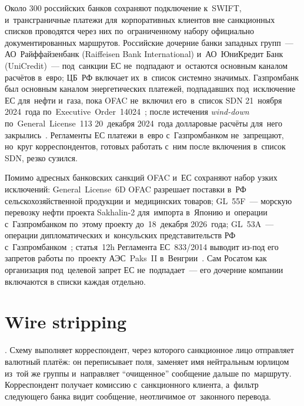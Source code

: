 Около 300 российских банков сохраняют подключение к~SWIFT,
и~трансграничные платежи для~корпоративных клиентов вне санкционных списков проводятся
через них по~ограниченному набору официально документированных маршрутов. Российские
дочерние банки западных групп~--- АО~Райффайзенбанк (Raiffeisen Bank International)
и~АО~ЮниКредит Банк (UniCredit)~--- под~санкции ЕС не~подпадают и~остаются
основным каналом расчётов в~евро; ЦБ~РФ включает их~в~список системно
значимых. Газпромбанк был основным каналом энергетических платежей,
подпадавших под~исключение ЕС для~нефти и~газа, пока OFAC не~включил его~в~список SDN
21~ноября 2024~года по~Executive~Order~14024~\cite{ofac-jy2725-gazprombank}; после истечения
\textit{wind-down} по~General~License~113 20~декабря 2024~года долларовые расчёты
для~него закрылись~\cite{ofac-gl-113}. Регламенты ЕС платежи в~евро с~Газпромбанком не~запрещают, но~круг
корреспондентов, готовых работать с~ним после включения в~список SDN, резко сузился.

Помимо
адресных банковских санкций OFAC и~ЕС сохраняют набор узких
исключений: General~License~6D OFAC разрешает поставки в~РФ
сельскохозяйственной продукции и~медицинских товаров; GL~55F~--- морскую
перевозку нефти проекта Sakhalin-2 для~импорта в~Японию и~операции
с~Газпромбанком по~этому проекту до~18~декабря 2026~года; GL~53A~---
операции дипломатических и~консульских представительств РФ
с~Газпромбанком~\cite{ofac-russia-sanctions}; статья~12h Регламента ЕС~833/2014
выводит из-под его запретов работы по~проекту АЭС~Paks~II
в~Венгрии~\cite{eu-reg-833-2014}. Сам Росатом как организация под~целевой
запрет ЕС не~подпадает~--- его дочерние компании включаются
в списки каждая отдельно.

\section{Wire stripping}\label{sec:sanctions-wire-stripping}

.
Схему выполняет корреспондент, через которого санкционное лицо отправляет
валютный платёж: он переписывает поля, заменяет имя нейтральным
юрлицом из~той же группы и~направляет \enquote{очищенное} сообщение дальше
по~маршруту. Корреспондент получает комиссию с~санкционного клиента,
а~фильтр следующего банка видит сообщение, неотличимое от~законного
перевода.

